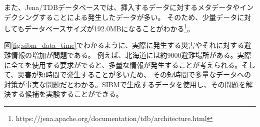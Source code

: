 また、Jena/TDBデータベースでは、挿入するデータに対するメタデータやインデクシングすることによる発生したデータが多い。
そのため、少量データに対してもデータベースサイズが192.0MBになることがわかる\footnote{https://jena.apache.org/documentation/tdb/architecture.html}。

図\ref{fig:sibm_data_time}でわかるように、実際に発生する災害やそれに対する避難情報の増加が問題である。
例えば、北海道には約9000避難場所がある。実際に全てを使用する要求がでると、多量な情報が発生することが考えられる。そして、災害が短時間で発生することが多いため、
その短時間で多量なデータへの対策が事実な問題だとわかる。SIBMで生成するデータを使用し、その問題を解決する候補を実験することができる。
